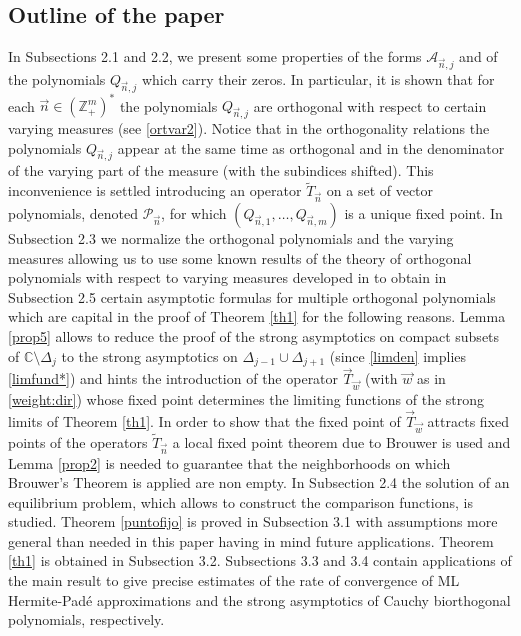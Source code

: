\documentclass{amsart}
\numberwithin{equation}{section}
\theoremstyle{definition}
\newcommand{\ZZ}{\mathbb{Z}}      %
\newcommand{\CC}{\mathbb{C}}      %
\newcommand{\n}{\vec{n}}          %
\begin{document}
\subsection{Outline of the paper} In Subsections 2.1 and 2.2, we present some properties of the forms $\mathcal{A}_{\n,j}$ and of the polynomials $Q_{\n,j}$ which carry their zeros.  In particular, it is shown that for each $\n \in (\ZZ_+^m)^*$ the polynomials $Q_{\n,j}$ are orthogonal with respect to certain varying measures (see \eqref{ortvar2}). Notice that in the orthogonality relations the polynomials $Q_{\n,j}$ appear at the same time as orthogonal and in the denominator of the varying part of the measure (with the subindices shifted). This inconvenience is settled introducing
an operator $\tilde{T}_{\n}$ on a set of vector polynomials, denoted $\mathcal{P}_{\n}$, for which $(Q_{\n,1}, \ldots, Q_{\n,m})$ is a unique fixed point. In Subsection 2.3 we normalize the orthogonal polynomials and the varying measures  allowing us to use some known results of the theory of orthogonal polynomials with respect to varying measures developed in \cite{lagober98,bernardo_lago1,LGLago} to obtain in Subsection 2.5 certain asymptotic formulas for multiple orthogonal polynomials which are capital in the proof of Theorem \ref{th1} for the following reasons. Lemma \ref{prop5} allows to reduce the proof of the strong asymptotics on compact subsets of $\CC \setminus \Delta_j$ to the strong asymptotics on $\Delta_{j-1} \cup \Delta_{j+1}$ (since \eqref{limden}
implies \eqref{limfund*}) and hints the introduction of the operator $\vec{T}_{\vec{w}}$ (with $\vec{w}$ as in \eqref{weight:dir}) whose fixed point determines the limiting functions of the strong limits of Theorem \ref{th1}. In order to show that the fixed point of $\vec{T}_{\vec{w}}$  attracts fixed points of the operators $\tilde{T}_{\n}$ a local fixed point theorem due
to Brouwer is used and Lemma \ref{prop2} is needed to guarantee that the neighborhoods on which Brouwer's Theorem is applied are non empty.  In Subsection 2.4 the solution of an equilibrium problem, which allows to construct the comparison functions, is studied. Theorem \ref{puntofijo} is proved in Subsection 3.1 with assumptions more general than needed in this paper having in mind future applications. Theorem \ref{th1} is obtained in Subsection 3.2. Subsections 3.3 and 3.4  contain applications of the main result  to give precise estimates of the rate of convergence of ML Hermite-Pad\'e approximations and the strong asymptotics of Cauchy biorthogonal polynomials, respectively.
\end{document}
